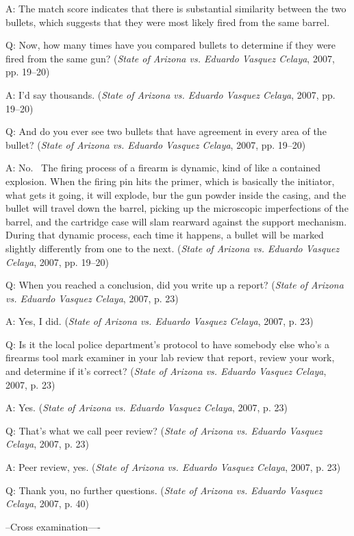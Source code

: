 \documentclass[print]{nuthesis}
\begin{document}
A: The match score indicates that there is substantial similarity between the two bullets, which suggests that they were most likely fired from the same barrel.

Q: Now, how many times have you compared bullets to determine if they were fired from the same gun? (\emph{State of {Arizona} vs. Eduardo {Vasquez} {Celaya}}, 2007, pp. 19--20)

A: I'd say thousands. (\emph{State of {Arizona} vs. Eduardo {Vasquez} {Celaya}}, 2007, pp. 19--20)

Q: And do you ever see two bullets that have agreement in every area of the bullet? (\emph{State of {Arizona} vs. Eduardo {Vasquez} {Celaya}}, 2007, pp. 19--20)

A: No.~
The firing process of a firearm is dynamic, kind of like a contained explosion.
When the firing pin hits the primer, which is basically the initiator, what gets it going, it will explode, bur the gun powder inside the casing, and the bullet will travel down the barrel, picking up the microscopic imperfections of the barrel, and the cartridge case will slam rearward against the support mechanism.
During that dynamic process, each time it happens, a bullet will be marked slightly differently from one to the next. (\emph{State of {Arizona} vs. Eduardo {Vasquez} {Celaya}}, 2007, pp. 19--20)

Q: When you reached a conclusion, did you write up a report? (\emph{State of {Arizona} vs. Eduardo {Vasquez} {Celaya}}, 2007, p. 23)

A: Yes, I did. (\emph{State of {Arizona} vs. Eduardo {Vasquez} {Celaya}}, 2007, p. 23)

Q: Is it the local police department's protocol to have somebody else who's a firearms tool mark examiner in your lab review that report, review your work, and determine if it's correct? (\emph{State of {Arizona} vs. Eduardo {Vasquez} {Celaya}}, 2007, p. 23)

A: Yes. (\emph{State of {Arizona} vs. Eduardo {Vasquez} {Celaya}}, 2007, p. 23)

Q: That's what we call peer review? (\emph{State of {Arizona} vs. Eduardo {Vasquez} {Celaya}}, 2007, p. 23)

A: Peer review, yes. (\emph{State of {Arizona} vs. Eduardo {Vasquez} {Celaya}}, 2007, p. 23)

Q: Thank you, no further questions. (\emph{State of {Arizona} vs. Eduardo {Vasquez} {Celaya}}, 2007, p. 40)

--Cross examination----
\end{document}
